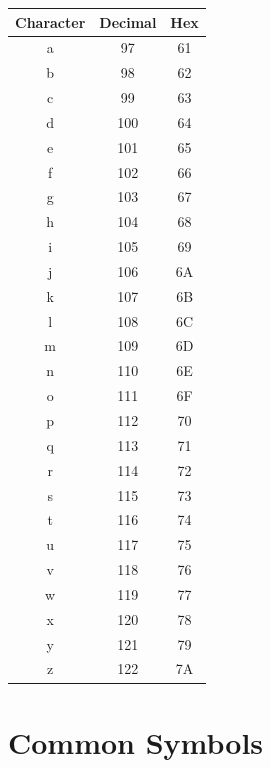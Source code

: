 \documentclass[12pt,openany]{book}
\begin{document}
\begin{center}
\begin{tabular}{|c|c|c|}
\hline
Character & Decimal & Hex \\
\hline
a & 97 & 61 \\
b & 98 & 62 \\
c & 99 & 63 \\
d & 100 & 64 \\
e & 101 & 65 \\
f & 102 & 66 \\
g & 103 & 67 \\
h & 104 & 68 \\
i & 105 & 69 \\
j & 106 & 6A \\
k & 107 & 6B \\
l & 108 & 6C \\
m & 109 & 6D \\
n & 110 & 6E \\
o & 111 & 6F \\
p & 112 & 70 \\
q & 113 & 71 \\
r & 114 & 72 \\
s & 115 & 73 \\
t & 116 & 74 \\
u & 117 & 75 \\
v & 118 & 76 \\
w & 119 & 77 \\
x & 120 & 78 \\
y & 121 & 79 \\
z & 122 & 7A \\
\hline
\end{tabular}
\end{center}

\section{Common Symbols}
\end{document}
